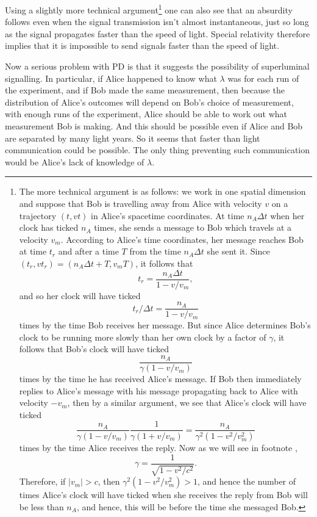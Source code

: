Using a slightly more technical argument\footnote{The more technical argument is as follows: we work in one spatial dimension and suppose that Bob is travelling away from Alice with velocity $v$ on a trajectory $(t, vt)$  in Alice's spacetime coordinates. At time $n_A \Delta t$ when her clock has ticked $n_A$ times, she sends a message to Bob which travels at a velocity $v_m$. According to Alice's time coordinates, her message reaches Bob at time $t_r$ and after a time $T$ from the time  $n_A \Delta t$ she sent it. Since $(t_r, v t_r)=(n_A \Delta t +T, v_m T)$, it follows that 
$$t_r=\frac{n_A\Delta t}{1-v/v_m},$$ and so her clock will have ticked $$t_r/\Delta t=\frac{n_A}{1-v/v_m}$$ times by the time Bob receives her message. But since Alice determines Bob's clock to be running more slowly than her own clock by a factor of $\gamma$, it follows that Bob's clock will have ticked  
$$\frac{n_A}{\gamma(1-v/v_m)}$$ times by the time he has received Alice's message. If Bob then immediately replies to Alice's message with his message propagating back to Alice with velocity $-v_m$, then by a similar argument, we see that Alice's clock will have ticked 
$$\frac{n_A}{\gamma(1-v/v_m)}\frac{1}{\gamma(1+v/v_m)}=\frac{n_A}{\gamma^2(1-v^2/v_m^2)}$$ times by the time
Alice receives the reply. Now as we will see in footnote , $$\gamma=\frac{1}{\sqrt{1-v^2/c^2}}.$$ 
Therefore, if $|v_m|>c$, then $\gamma^2(1-v^2/v_m^2)>1$, and hence the number of times Alice's clock will have ticked when she receives the reply from Bob will be less than $n_A$, and hence, this will be before the time she messaged Bob.} 
one can also see that an absurdity follows even when the signal transmission isn't almost instantaneous, just so long as the signal propagates faster than the speed of light. Special relativity therefore implies that it is impossible to send signals faster than the speed of light.

Now a serious problem with PD is that it suggests the possibility of superluminal signalling. In particular, if Alice happened to know what $\lambda$ was for each run of the experiment, and if Bob made the same measurement, then because the distribution of Alice's outcomes will depend on Bob's choice of measurement, with enough runs of the experiment, Alice should be able to work out what measurement Bob is making. And this should be possible even if Alice and Bob are separated by many light years. So it seems that faster than light communication could be possible. The only thing preventing such communication would be Alice's lack of knowledge of $\lambda$. 

